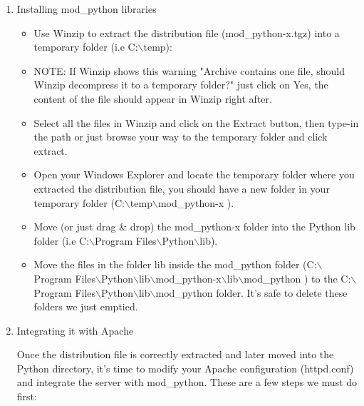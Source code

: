 \begin{enumerate}

\item
Installing mod_python libraries

\begin{itemize}

\item
Use Winzip to extract the distribution file (mod_python-x.tgz) into a
temporary folder (i.e C:$\backslash$temp):

\item
NOTE: If Winzip shows this warning "Archive contains one file, should
Winzip decompress it to a temporary folder?" just click on Yes, the
content of the file should appear in Winzip right after.

\item
Select all the files in Winzip and click on the Extract button, then
type-in the path or just browse your way to the temporary folder and
click extract.

\item       
Open your Windows Explorer and locate the temporary folder where you
extracted the distribution file, you should have a new folder in your
temporary folder (C:$\backslash$temp$\backslash$mod_python-x ).

\item            
Move (or just drag \& drop) the mod_python-x folder into the Python lib
folder (i.e C:$\backslash$Program Files$\backslash$Python$\backslash$lib).

\item            
Move the files in the folder lib inside the mod_python folder
(C:$\backslash$Program Files$\backslash$Python$\backslash$lib$\backslash$mod_python-x$\backslash$lib$\backslash$mod_python ) to the
C:$\backslash$Program Files$\backslash$Python$\backslash$lib$\backslash$mod_python folder. It's safe to delete
these folders we just emptied.

\end{itemize}

\item
Integrating it with Apache

      
Once the distribution file is correctly extracted and later moved into
the Python directory, it's time to modify your Apache configuration
(httpd.conf) and integrate the server with mod_python. These are a few
steps we must do first:

\begin{itemize}


\end{itemize}
\end{enumerate}
